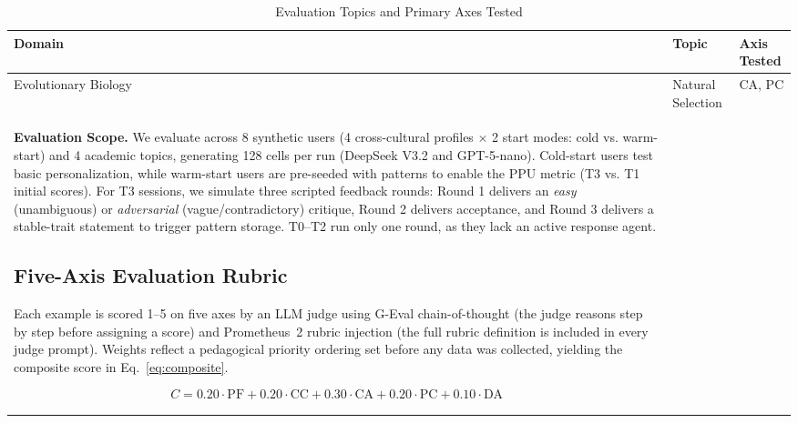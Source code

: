 \documentclass[conference]{IEEEtran}
\begin{document}
\begin{table}[htbp]
\caption{Evaluation Topics and Primary Axes Tested}
\label{tab:topics}
\begin{center}
\begin{tabular}{lll}
\toprule
\textbf{Domain} & \textbf{Topic} & \textbf{Axis Tested} \\
\midrule
Evolutionary Biology & Natural Selection   & CA, PC \\
\textbf{Evaluation Scope.} We evaluate across 8 synthetic users (4 cross-cultural profiles $\times$ 2 start modes: cold vs. warm-start) and 4 academic topics, generating 128 cells per run (DeepSeek V3.2 and GPT-5-nano). Cold-start users test basic personalization, while warm-start users are pre-seeded with patterns to enable the PPU metric (T3 vs. T1 initial scores). For T3 sessions, we simulate three scripted feedback rounds: Round 1 delivers an \textit{easy} (unambiguous) or \textit{adversarial} (vague/contradictory) critique, Round 2 delivers acceptance, and Round 3 delivers a stable-trait statement to trigger pattern storage. T0--T2 run only one round, as they lack an active response agent.

\subsection{Five-Axis Evaluation Rubric}

Each example is scored 1--5 on five axes by an LLM judge using G-Eval chain-of-thought \cite{b4} (the judge reasons step by step before assigning a score) and Prometheus~2 rubric injection \cite{b5} (the full rubric definition is included in every judge prompt). Weights reflect a pedagogical priority ordering set before any data was collected, yielding the composite score in Eq.~\ref{eq:composite}.

\begin{equation}
C = 0.20 \cdot \text{PF} + 0.20 \cdot \text{CC} + 0.30 \cdot \text{CA} + 0.20 \cdot \text{PC} + 0.10 \cdot \text{DA}
\label{eq:composite}
\end{equation}


\end{tabular}
\end{center}
\end{table}
\end{document}
